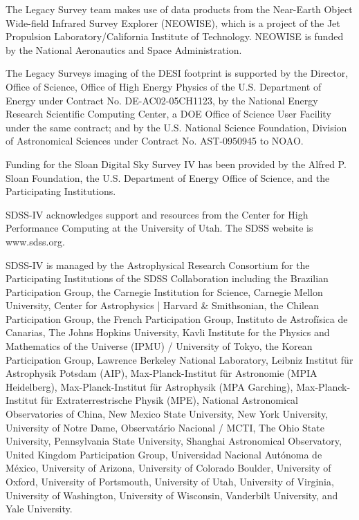 \documentclass[a4paper,11pt]{article}
\begin{document}
    The Legacy Survey team makes use of data products from the Near-Earth Object Wide-field Infrared Survey Explorer (NEOWISE), which is a project of the Jet Propulsion Laboratory/California Institute of Technology. NEOWISE is funded by the National Aeronautics and Space Administration.
    
    The Legacy Surveys imaging of the DESI footprint is supported by the Director, Office of Science, Office of High Energy Physics of the U.S. Department of Energy under Contract No. DE-AC02-05CH1123, by the National Energy Research Scientific Computing Center, a DOE Office of Science User Facility under the same contract; and by the U.S. National Science Foundation, Division of Astronomical Sciences under Contract No. AST-0950945 to NOAO.
    
    Funding for the Sloan Digital Sky Survey IV has been provided by the Alfred P. Sloan Foundation, the U.S. Department of Energy Office of Science, and the Participating Institutions. 
    
    SDSS-IV acknowledges support and resources from the Center for High Performance Computing  at the University of Utah. The SDSS website is www.sdss.org.
    
    SDSS-IV is managed by the Astrophysical Research Consortium for the Participating Institutions of the SDSS Collaboration including the Brazilian Participation Group, the Carnegie Institution for Science, Carnegie Mellon University, Center for Astrophysics | Harvard \& Smithsonian, the Chilean Participation Group, the French Participation Group, Instituto de Astrof\'isica de Canarias, The Johns Hopkins University, Kavli Institute for the Physics and Mathematics of the Universe (IPMU) / University of Tokyo, the Korean Participation Group, Lawrence Berkeley National Laboratory, Leibniz Institut f\"ur Astrophysik Potsdam (AIP),  Max-Planck-Institut f\"ur Astronomie (MPIA Heidelberg), Max-Planck-Institut f\"ur Astrophysik (MPA Garching), Max-Planck-Institut f\"ur Extraterrestrische Physik (MPE), National Astronomical Observatories of China, New Mexico State University, New York University, University of Notre Dame, Observat\'ario Nacional / MCTI, The Ohio State University, Pennsylvania State University, Shanghai Astronomical Observatory, United Kingdom Participation Group, Universidad Nacional Aut\'onoma de M\'exico, University of Arizona, University of Colorado Boulder, University of Oxford, University of Portsmouth, University of Utah, University of Virginia, University of Washington, University of Wisconsin, Vanderbilt University, and Yale University. 
    
\end{document}
